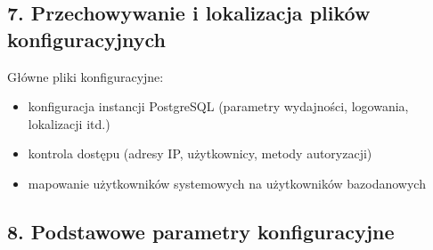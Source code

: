 \documentclass[a4paper,11pt,openany,english]{sphinxmanual}
\begin{document}
\subsection{7. Przechowywanie i lokalizacja plików konfiguracyjnych}
\label{\detokenize{rozdzial2/Konfiguracja_baz_danych/Konfiguracja_baz_danych:przechowywanie-i-lokalizacja-plikow-konfiguracyjnych}}
\sphinxAtStartPar
Główne pliki konfiguracyjne:
\begin{itemize}
\item {} 
\sphinxAtStartPar
{} \textendash{} konfiguracja instancji PostgreSQL (parametry wydajności, logowania, lokalizacji itd.)

\item {} 
\sphinxAtStartPar
{} \textendash{} kontrola dostępu (adresy IP, użytkownicy, metody autoryzacji)

\item {} 
\sphinxAtStartPar
{} \textendash{} mapowanie użytkowników systemowych na użytkowników bazodanowych

\end{itemize}


\subsection{8. Podstawowe parametry konfiguracyjne}
\label{\detokenize{rozdzial2/Konfiguracja_baz_danych/Konfiguracja_baz_danych:podstawowe-parametry-konfiguracyjne}}
\sphinxAtStartPar
{}

\begin{sphinxVerbatim}[commandchars=\\\{\}]
  
  
\end{sphinxVerbatim}

\sphinxAtStartPar
{}

\begin{sphinxVerbatim}[commandchars=\\\{\}]
           
                   
      
\end{sphinxVerbatim}
\end{document}
